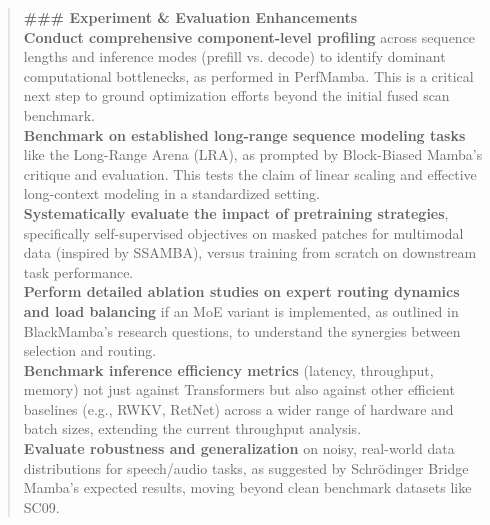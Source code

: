 \begin{quote}
\begin{tcolorbox}[breakable,colback=almond!20!white, colframe=almond!60!black, title=\textbf{Case Study (Mamba: Linear-Time Sequence Modeling with Selective State Spaces)}]
        \textbf{\#\#\# Experiment \& Evaluation Enhancements}\\
        \textbf{Conduct comprehensive component-level profiling} across sequence lengths and inference modes (prefill vs. decode) to identify dominant computational bottlenecks, as performed in PerfMamba. This is a critical next step to ground optimization efforts beyond the initial fused scan benchmark.\\
        \textbf{Benchmark on established long-range sequence modeling tasks} like the Long-Range Arena (LRA), as prompted by Block-Biased Mamba's critique and evaluation. This tests the claim of linear scaling and effective long-context modeling in a standardized setting.\\
        \textbf{Systematically evaluate the impact of pretraining strategies}, specifically self-supervised objectives on masked patches for multimodal data (inspired by SSAMBA), versus training from scratch on downstream task performance.\\
        \textbf{Perform detailed ablation studies on expert routing dynamics and load balancing} if an MoE variant is implemented, as outlined in BlackMamba's research questions, to understand the synergies between selection and routing.\\
        \textbf{Benchmark inference efficiency metrics} (latency, throughput, memory) not just against Transformers but also against other efficient baselines (e.g., RWKV, RetNet) across a wider range of hardware and batch sizes, extending the current throughput analysis.\\
        \textbf{Evaluate robustness and generalization} on noisy, real-world data distributions for speech/audio tasks, as suggested by Schrödinger Bridge Mamba's expected results, moving beyond clean benchmark datasets like SC09.\\


\end{tcolorbox}
\end{quote}
